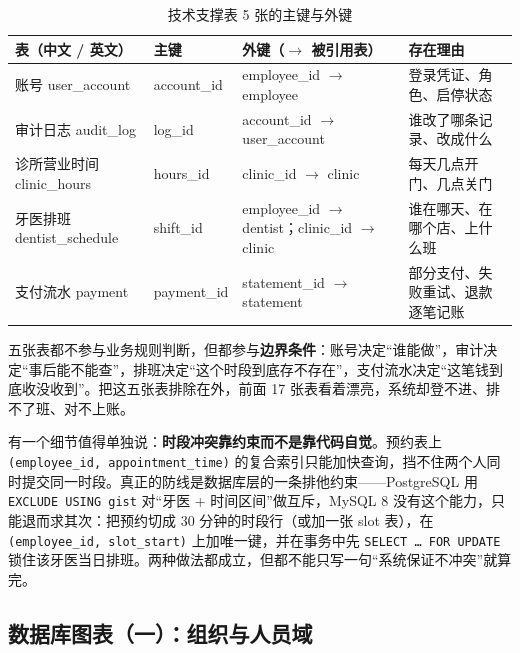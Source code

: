 \documentclass[11pt,a4paper]{ctexart}
\begin{document}
\begin{table}[H]
\centering
\caption{技术支撑表 5 张的主键与外键}
{\footnotesize
\begin{tabularx}{\linewidth}{@{}L{3.1cm}L{2.2cm}L{5.0cm}X@{}}
\toprule
\textbf{\textcolor{adcblue!92}{表（中文 / 英文）}} & \textbf{\textcolor{adcblue!92}{主键}} & \textbf{\textcolor{adcblue!92}{外键（$\rightarrow$ 被引用表）}} & \textbf{\textcolor{adcblue!92}{存在理由}} \\
\midrule
账号 user\_account & account\_id & employee\_id $\rightarrow$ employee & 登录凭证、角色、启停状态 \\
审计日志 audit\_log & log\_id & account\_id $\rightarrow$ user\_account & 谁改了哪条记录、改成什么 \\
诊所营业时间 clinic\_hours & hours\_id & clinic\_id $\rightarrow$ clinic & 每天几点开门、几点关门 \\
牙医排班 dentist\_schedule & shift\_id & employee\_id $\rightarrow$ dentist；clinic\_id $\rightarrow$ clinic & 谁在哪天、在哪个店、上什么班 \\
支付流水 payment & payment\_id & statement\_id $\rightarrow$ statement & 部分支付、失败重试、退款逐笔记账 \\
\bottomrule
\end{tabularx}
}
\end{table}

五张表都不参与业务规则判断，但都参与\textbf{边界条件}：账号决定“谁能做”，审计决定“事后能不能查”，排班决定“这个时段到底存不存在”，支付流水决定“这笔钱到底收没收到”。把这五张表排除在外，前面 17 张表看着漂亮，系统却登不进、排不了班、对不上账。

有一个细节值得单独说：\textbf{时段冲突靠约束而不是靠代码自觉}。预约表上 \texttt{(employee\_id, appointment\_time)} 的复合索引只能加快查询，挡不住两个人同时提交同一时段。真正的防线是数据库层的一条排他约束——PostgreSQL 用 \texttt{EXCLUDE USING gist} 对“牙医 + 时间区间”做互斥，MySQL 8 没有这个能力，只能退而求其次：把预约切成 30 分钟的时段行（或加一张 slot 表），在 \texttt{(employee\_id, slot\_start)} 上加唯一键，并在事务中先 \texttt{SELECT \dots\ FOR UPDATE} 锁住该牙医当日排班。两种做法都成立，但都不能只写一句“系统保证不冲突”就算完。

\subsection{数据库图表（一）：组织与人员域}
\end{document}
